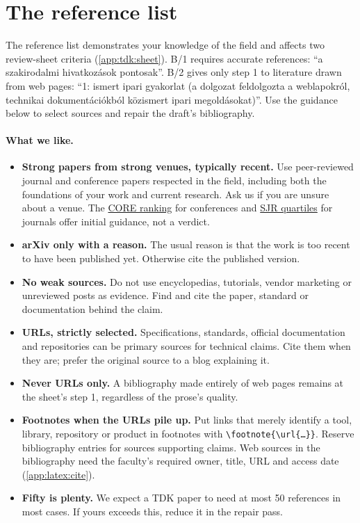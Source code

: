 \section{The reference list}\label{app:writing:refs}
The reference list demonstrates your knowledge of the field and affects two review-sheet criteria (\cref{app:tdk:sheet}). B/1 requires accurate references: \enquote{a szakirodalmi hivatkozások pontosak}. B/2 gives only step 1 to literature drawn from web pages: \enquote{1: ismert ipari gyakorlat (a dolgozat feldolgozta a weblapokról, technikai dokumentációkból közismert ipari megoldásokat)}. Use the guidance below to select sources and repair the draft's bibliography.

\paragraph{What we like.}
\begin{itemize}
  \item \textbf{Strong papers from strong venues, typically recent.} Use peer-reviewed journal and conference papers respected in the field, including both the foundations of your work and current research. Ask us if you are unsure about a venue. The \href{https://portal.core.edu.au/conf-ranks/}{CORE ranking} for conferences and \href{https://www.scimagojr.com/}{SJR quartiles} for journals offer initial guidance, not a verdict.
  \item \textbf{arXiv only with a reason.} The usual reason is that the work is too recent to have been published yet. Otherwise cite the published version.
  \item \textbf{No weak sources.} Do not use encyclopedias, tutorials, vendor marketing or unreviewed posts as evidence. Find and cite the paper, standard or documentation behind the claim.
  \item \textbf{URLs, strictly selected.} Specifications, standards, official documentation and repositories can be primary sources for technical claims. Cite them when they are; prefer the original source to a blog explaining it.
  \item \textbf{Never URLs only.} A bibliography made entirely of web pages remains at the sheet's step 1, regardless of the prose's quality.
  \item \textbf{Footnotes when the URLs pile up.} Put links that merely identify a tool, library, repository or product in footnotes with \texttt{\textbackslash footnote\{\textbackslash url\{\dots\}\}}. Reserve bibliography entries for sources supporting claims. Web sources in the bibliography need the faculty's required owner, title, URL and access date (\cref{app:latex:cite}).
  \item \textbf{Fifty is plenty.} We expect a TDK paper to need at most 50 references in most cases. If yours exceeds this, reduce it in the repair pass.
\end{itemize}

